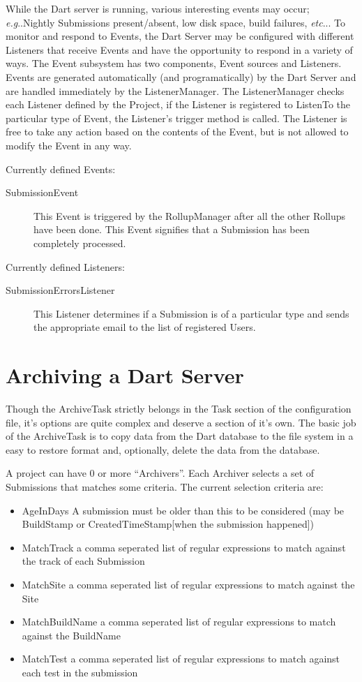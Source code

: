 \documentclass{InsightBook}
\makeatletter
\DeclareRobustCommand\onedot{\futurelet\@let@token\@onedot}
\def\@onedot{\ifx\@let@token.\else.\xspace\fi}
\def\eg{\emph{e.g}\onedot} \def\Eg{\emph{E.g}\onedot}
\def\etc{\emph{etc}\onedot}
\makeatother
\begin{document}
While the Dart server is running, various interesting events may
occur; \eg Nightly Submissions present/absent, low disk space, build
failures, \etc.  To monitor and respond to Events, the Dart Server may
be configured with different Listeners that receive Events and have
the opportunity to respond in a variety of ways.  The Event subsystem
has two components, Event sources and Listeners.  Events are generated
automatically (and programatically) by the Dart Server and are handled
immediately by the ListenerManager.  The ListenerManager checks each
Listener defined by the Project, if the Listener is registered to
ListenTo the particular type of Event, the Listener's trigger method
is called.  The Listener is free to take any action based on the
contents of the Event, but is not allowed to modify the Event in any
way.

Currently defined Events:
\begin{description}
\item[SubmissionEvent] This Event is triggered by the RollupManager
after all the other Rollups have been done.  This Event signifies that
a Submission has been completely processed.
\end{description}


Currently defined Listeners:
\begin{description}
\item[SubmissionErrorsListener]  This Listener determines if a
Submission is of a particular type and sends the appropriate email to
the list of registered Users.
\end{description}
\section{Archiving a Dart Server}
\label{Section:ArchiveTask}

Though the ArchiveTask strictly belongs in the Task section of the
configuration file, it's options are quite complex and deserve a
section of it's own.  The basic job of the ArchiveTask is to copy data
from the Dart database to the file system in a easy to restore format
and, optionally, delete the data from the database.



A project can have 0 or more ``Archivers''.  Each Archiver selects a set
of Submissions that matches some criteria.  The current selection criteria are:

\begin{itemize}
\item AgeInDays  A submission must be older than this to be considered (may be BuildStamp or CreatedTimeStamp[when the submission happened])
\item MatchTrack a comma seperated list of regular expressions to match against the track of each Submission
\item MatchSite a comma seperated list of regular expressions to match against the Site
\item MatchBuildName a comma seperated list of regular expressions to match against the BuildName
\item MatchTest a comma seperated list of regular expressions to match
against each test in the submission
\end{itemize}
\end{document}
